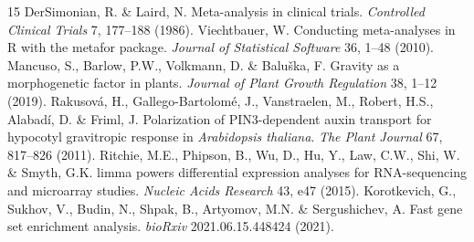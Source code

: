 \documentclass[11pt,a4paper]{article}
\begin{document}
\begin{thebibliography}{15}
 DerSimonian, R. \& Laird, N. Meta-analysis in clinical trials. \textit{Controlled Clinical Trials} 7, 177--188 (1986).
 Viechtbauer, W. Conducting meta-analyses in R with the metafor package. \textit{Journal of Statistical Software} 36, 1--48 (2010).
 Mancuso, S., Barlow, P.W., Volkmann, D. \& Balu\v{s}ka, F. Gravity as a morphogenetic factor in plants. \textit{Journal of Plant Growth Regulation} 38, 1--12 (2019).
 Rakusov\'a, H., Gallego-Bartolom\'e, J., Vanstraelen, M., Robert, H.S., Alabad\'i, D. \& Friml, J. Polarization of PIN3-dependent auxin transport for hypocotyl gravitropic response in \textit{Arabidopsis thaliana}. \textit{The Plant Journal} 67, 817--826 (2011).
 Ritchie, M.E., Phipson, B., Wu, D., Hu, Y., Law, C.W., Shi, W. \& Smyth, G.K. limma powers differential expression analyses for RNA-sequencing and microarray studies. \textit{Nucleic Acids Research} 43, e47 (2015).
 Korotkevich, G., Sukhov, V., Budin, N., Shpak, B., Artyomov, M.N. \& Sergushichev, A. Fast gene set enrichment analysis. \textit{bioRxiv} 2021.06.15.448424 (2021).
\end{thebibliography}
\end{document}

